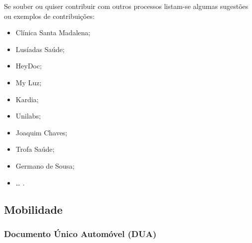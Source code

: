 Se souber ou quiser contribuir com outros processos listam-se algumas
sugestões ou exemplos de contribuições:
\begin{itemize}
	\item Clínica Santa Madalena;
	\item Lusíadas Saúde;
	\item HeyDoc;
	\item My Luz;
	\item Kardia;
	\item Unilabs;
	\item Joaquim Chaves;
	\item Trofa Saúde;
	\item Germano de Sousa;
	\item {\ldots} .
\end{itemize}

\subsection{Mobilidade}

\subsubsection{Documento Único Automóvel (DUA)}

